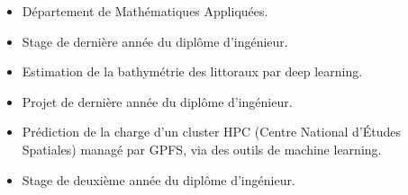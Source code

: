 \documentclass[10pt,a4paper,academicons]{altacv}
\begin{document}

\begin{itemize}
    \item D\'{e}partement de Math\'{e}matiques Appliqu\'{e}es.
    \item Stage de derni\`{e}re ann\'{e}e du dipl\^{o}me d'ing\'{e}nieur.
\end{itemize}

\divider

\begin{itemize}
    \item Estimation de la bathym\'{e}trie des littoraux par deep learning.
    \item Projet de derni\`{e}re ann\'{e}e du dipl\^{o}me d'ing\'{e}nieur.
\end{itemize}

\divider

\begin{itemize}
    \item Pr\'{e}diction de la charge d'un cluster HPC (Centre National d'\'{E}tudes Spatiales) manag\'{e} par GPFS, via des outils de machine learning.
    \item Stage de deuxi\`{e}me ann\'{e}e du dipl\^{o}me d'ing\'{e}nieur.
\end{itemize}
\end{document}
